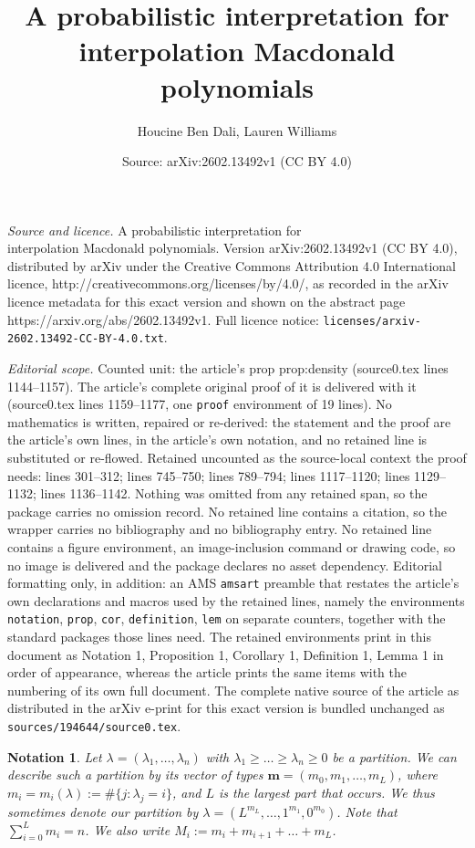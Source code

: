 \documentclass[10pt,a4paper]{amsart}
\title{A probabilistic interpretation for\\ interpolation Macdonald polynomials}
\author{Houcine Ben Dali, Lauren Williams}
\date{Source: arXiv:2602.13492v1 (CC BY 4.0)}
\newtheorem{notation}{Notation}
\begin{document}
\maketitle

\noindent\emph{Source and licence.} A probabilistic interpretation for\\ interpolation Macdonald polynomials. Version arXiv:2602.13492v1 (CC BY 4.0), distributed by arXiv under the Creative Commons Attribution 4.0 International licence, http://creativecommons.org/licenses/by/4.0/, as recorded in the arXiv licence metadata for this exact version and shown on the abstract page https://arxiv.org/abs/2602.13492v1. Full licence notice: \texttt{licenses/arxiv-2602.13492-CC-BY-4.0.txt}.\par\smallskip

\noindent\textit{Editorial scope.} Counted unit: the article's prop prop:density (source0.tex lines 1144--1157). The article's complete original proof of it is delivered with it (source0.tex lines 1159--1177, one \texttt{proof} environment of 19 lines). No mathematics is written, repaired or re-derived: the statement and the proof are the article's own lines, in the article's own notation, and no retained line is substituted or re-flowed.  Retained uncounted as the source-local context the proof needs: lines 301--312; lines 745--750; lines 789--794; lines 1117--1120; lines 1129--1132; lines 1136--1142.  Nothing was omitted from any retained span, so the package carries no omission record.  No retained line contains a citation, so the wrapper carries no bibliography and no bibliography entry.  No retained line contains a figure environment, an image-inclusion command or drawing code, so no image is delivered and the package declares no asset dependency.  Editorial formatting only, in addition: an AMS \texttt{amsart} preamble that restates the article's own declarations and macros used by the retained lines, namely the environments \texttt{notation}, \texttt{prop}, \texttt{cor}, \texttt{definition}, \texttt{lem} on separate counters, together with the standard packages those lines need.  The retained environments print in this document as Notation 1, Proposition 1, Corollary 1, Definition 1, Lemma 1 in order of appearance, whereas the article prints the same items with the numbering of its own full document.  The complete native source of the article as distributed in the arXiv e-print for this exact version is bundled unchanged as \texttt{sources/194644/source0.tex}.
\begin{notation}\label{not:type}
Let $\lambda=(\lambda_1,\dots, \lambda_n)$
with $\lambda_1\geq\dots\geq\lambda_n\geq 0$ be a partition. We can
describe such a partition by its vector of types
$\mathbf{m}=(m_0, m_1, \dots, m_L)$, where
$m_i=m_i(\lambda):=\#\{j:\lambda_j=i\}$,
and $L$ is the largest part that occurs.
We thus sometimes denote our partition by
$\lambda=(L^{m_L}, \dots, 1^{m_1}, 0^{m_0})$.
Note that $\sum_{i=0}^L m_i=n$.  We also write
$M_i:=m_i+ m_{i+1} + \dots + m_L$.
\end{notation}
\end{document}
